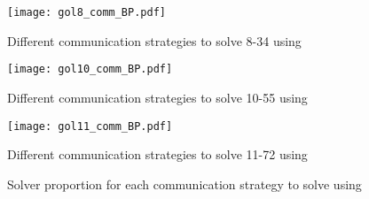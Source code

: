 \begin{figure}[!h]
\centering
\texttt{[image: gol8\_comm\_BP.pdf]}
\caption{Different communication strategies to solve \GRP{} 8-34 using \posl}\label{boxplot:834comm}
\end{figure}

\begin{figure}[!h]
\centering
\texttt{[image: gol10\_comm\_BP.pdf]}
\caption{Different communication strategies to solve \GRP{} 10-55 using \posl}\label{boxplot:1055comm}
\end{figure}

\begin{figure}[!h]
\centering
\texttt{[image: gol11\_comm\_BP.pdf]}
\caption{Different communication strategies to solve \GRP{} 11-72 using \posl}\label{boxplot:1172comm}
\end{figure}


\begin{figure}[!h]
\centering
{} %
\caption[]{Solver proportion for each communication strategy to solve \GRP{} using \posl}
\label{fig:boxplot_bar}
\end{figure}


%
%
